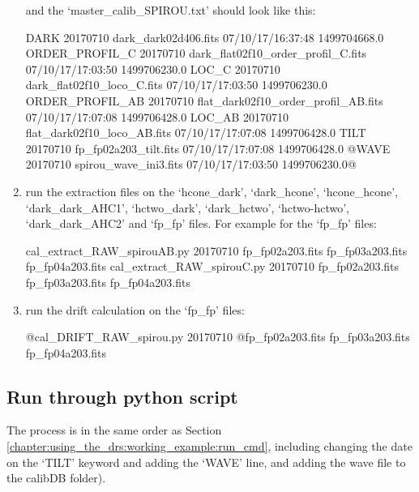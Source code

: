 \begin{enumerate}
\noindent and the `master\_calib\_SPIROU.txt' should look like this:
\begin{textbox}
DARK 20170710 dark_dark02d406.fits 07/10/17/16:37:48 1499704668.0
ORDER_PROFIL_C 20170710 dark_flat02f10_order_profil_C.fits 07/10/17/17:03:50 1499706230.0
LOC_C 20170710 dark_flat02f10_loco_C.fits 07/10/17/17:03:50 1499706230.0
ORDER_PROFIL_AB 20170710 flat_dark02f10_order_profil_AB.fits 07/10/17/17:07:08 1499706428.0
LOC_AB 20170710 flat_dark02f10_loco_AB.fits 07/10/17/17:07:08 1499706428.0
TILT 20170710 fp_fp02a203_tilt.fits 07/10/17/17:07:08 1499706428.0
@WAVE 20170710 spirou_wave_ini3.fits 07/10/17/17:03:50 1499706230.0@
\end{textbox}

\item run the extraction files on the `hcone\_dark', `dark\_hcone', `hcone\_hcone', `dark\_dark\_AHC1', `hctwo\_dark', `dark\_hctwo', `hctwo-hctwo', `dark\_dark\_AHC2' and `fp\_fp'  files. For example for the `fp\_fp' files:
\begin{cmdbox}
cal_extract_RAW_spirouAB.py 20170710 fp_fp02a203.fits fp_fp03a203.fits fp_fp04a203.fits
cal_extract_RAW_spirouC.py 20170710 fp_fp02a203.fits fp_fp03a203.fits fp_fp04a203.fits
\end{cmdbox}

\item run the drift calculation on the `fp\_fp' files:
\begin{cmdbox}
@cal_DRIFT_RAW_spirou.py 20170710 @fp_fp02a203.fits fp_fp03a203.fits fp_fp04a203.fits
\end{cmdbox}

\end{enumerate}

\clearpage
\newpage
\subsection{Run through python script}
\label{chapter:using_the_drs:working_example:run_python}

The process is in the same order as Section \ref{chapter:using_the_drs:working_example:run_cmd}, including changing the date on the `TILT' keyword and adding the `WAVE' line, and adding the wave file to the calibDB folder).

